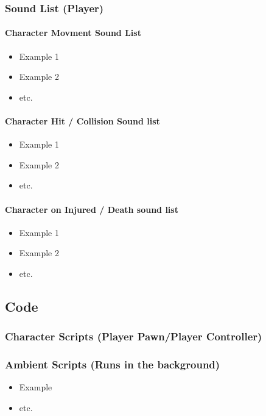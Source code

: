 \documentclass[14pt]{article}
\begin{document}
\subsubsection{Sound List (Player)}
\paragraph{Character Movment Sound List}
\begin{itemize}
    \item Example 1
    \item Example 2
    \item etc.
\end{itemize}

\paragraph{Character Hit / Collision Sound list}
\begin{itemize}
    \item Example 1
    \item Example 2
    \item etc.
\end{itemize}

\paragraph{Character on Injured / Death sound list}
\begin{itemize}
    \item Example 1
    \item Example 2
    \item etc.
\end{itemize}

\subsection{Code}
\subsubsection{Character Scripts (Player Pawn/Player Controller)}

\subsubsection{Ambient Scripts (Runs in the background)}
\begin{itemize}
    \item Example
    \item etc.
\end{itemize}
\end{document}
